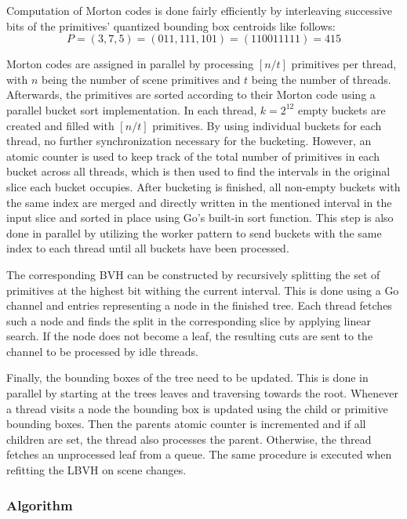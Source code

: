 Computation of Morton codes is done fairly efficiently by interleaving successive bits of the primitives' quantized bounding box 
centroids like follows: 
\[P=(3,7,5)=(011,111,101)=(110011111)=415\] %

Morton codes are assigned in parallel by processing $[n/t]$ primitives per thread, with $n$ being the number of scene primitives and $t$ being the number of threads. Afterwards, the primitives are sorted according to their Morton code using a parallel bucket sort implementation. In each thread, $k=2^{12}$ empty buckets are created and filled with $[n/t]$ primitives. By using individual buckets for each thread, no further synchronization necessary for the bucketing. However, an atomic counter is used to keep track of the total number of primitives in each bucket across all threads, which is then used to find the intervals in the original slice each bucket occupies. After bucketing is finished, all non-empty buckets with the same index are merged and directly written in the mentioned interval in the input slice and sorted in place using Go's built-in sort function. This step is also done in parallel by utilizing the worker pattern to send buckets with the same index to each thread until all buckets have been processed.

The corresponding BVH can be constructed by recursively splitting the set of primitives at the highest bit withing the current interval. This is done using a Go channel and entries representing a node in the finished tree. Each thread fetches such a node and finds the split in the corresponding slice by applying linear search. If the node does not become a leaf, the resulting cuts are sent to the channel to be processed by idle threads.

Finally, the bounding boxes of the tree need to be updated. This is done in parallel by starting at the trees leaves and traversing towards the root. Whenever a thread visits a node the bounding box is updated using the child or primitive bounding boxes. Then the parents atomic counter is incremented and if all children are set, the thread also processes the parent. Otherwise, the thread fetches an unprocessed leaf from a queue. The same procedure is executed when refitting the LBVH on scene changes. 
\subsubsection{Algorithm}




